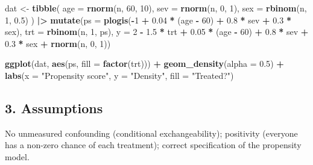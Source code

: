 \documentclass[
]{article}
\newenvironment{Shaded}{\begin{snugshade}}{\end{snugshade}}
\newcommand{\AttributeTok}[1]{\textcolor[rgb]{0.13,0.29,0.53}{#1}}
\newcommand{\DecValTok}[1]{\textcolor[rgb]{0.00,0.00,0.81}{#1}}
\newcommand{\FloatTok}[1]{\textcolor[rgb]{0.00,0.00,0.81}{#1}}
\newcommand{\FunctionTok}[1]{\textcolor[rgb]{0.13,0.29,0.53}{\textbf{#1}}}
\newcommand{\NormalTok}[1]{#1}
\newcommand{\OtherTok}[1]{\textcolor[rgb]{0.56,0.35,0.01}{#1}}
\newcommand{\SpecialCharTok}[1]{\textcolor[rgb]{0.81,0.36,0.00}{\textbf{#1}}}
\newcommand{\StringTok}[1]{\textcolor[rgb]{0.31,0.60,0.02}{#1}}
\begin{document}
\begin{Shaded}
\begin{Highlighting}[]
\NormalTok{dat }\OtherTok{\textless{}{-}} \FunctionTok{tibble}\NormalTok{(}
  \AttributeTok{age  =} \FunctionTok{rnorm}\NormalTok{(n, }\DecValTok{60}\NormalTok{, }\DecValTok{10}\NormalTok{),}
  \AttributeTok{sev  =} \FunctionTok{rnorm}\NormalTok{(n, }\DecValTok{0}\NormalTok{,   }\DecValTok{1}\NormalTok{),}
  \AttributeTok{sex  =} \FunctionTok{rbinom}\NormalTok{(n, }\DecValTok{1}\NormalTok{, }\FloatTok{0.5}\NormalTok{)}
\NormalTok{) }\SpecialCharTok{|\textgreater{}}
  \FunctionTok{mutate}\NormalTok{(}\AttributeTok{ps =} \FunctionTok{plogis}\NormalTok{(}\SpecialCharTok{{-}}\DecValTok{1} \SpecialCharTok{+} \FloatTok{0.04} \SpecialCharTok{*}\NormalTok{ (age }\SpecialCharTok{{-}} \DecValTok{60}\NormalTok{) }\SpecialCharTok{+} \FloatTok{0.8} \SpecialCharTok{*}\NormalTok{ sev }\SpecialCharTok{+} \FloatTok{0.3} \SpecialCharTok{*}\NormalTok{ sex),}
         \AttributeTok{trt =} \FunctionTok{rbinom}\NormalTok{(n, }\DecValTok{1}\NormalTok{, ps),}
         \AttributeTok{y   =} \DecValTok{2} \SpecialCharTok{{-}} \FloatTok{1.5} \SpecialCharTok{*}\NormalTok{ trt }\SpecialCharTok{+} \FloatTok{0.05} \SpecialCharTok{*}\NormalTok{ (age }\SpecialCharTok{{-}} \DecValTok{60}\NormalTok{) }\SpecialCharTok{+}
                 \FloatTok{0.8} \SpecialCharTok{*}\NormalTok{ sev }\SpecialCharTok{+} \FloatTok{0.3} \SpecialCharTok{*}\NormalTok{ sex }\SpecialCharTok{+} \FunctionTok{rnorm}\NormalTok{(n, }\DecValTok{0}\NormalTok{, }\DecValTok{1}\NormalTok{))}

\FunctionTok{ggplot}\NormalTok{(dat, }\FunctionTok{aes}\NormalTok{(ps, }\AttributeTok{fill =} \FunctionTok{factor}\NormalTok{(trt))) }\SpecialCharTok{+}
  \FunctionTok{geom\_density}\NormalTok{(}\AttributeTok{alpha =} \FloatTok{0.5}\NormalTok{) }\SpecialCharTok{+}
  \FunctionTok{labs}\NormalTok{(}\AttributeTok{x =} \StringTok{"Propensity score"}\NormalTok{, }\AttributeTok{y =} \StringTok{"Density"}\NormalTok{, }\AttributeTok{fill =} \StringTok{"Treated?"}\NormalTok{)}
\end{Highlighting}
\end{Shaded}

\subsection{3. Assumptions}\label{assumptions}

No unmeasured confounding (conditional exchangeability); positivity
(everyone has a non-zero chance of each treatment); correct
specification of the propensity model.
\end{document}
